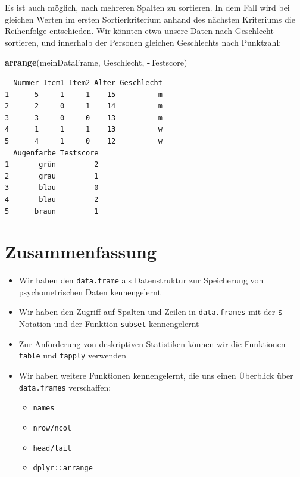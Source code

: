 \documentclass[12pt,]{tufte-book}
\newenvironment{Shaded}{\begin{snugshade}}{\end{snugshade}}
\newcommand{\KeywordTok}[1]{\textcolor[rgb]{0.13,0.29,0.53}{\textbf{#1}}}
\newcommand{\OperatorTok}[1]{\textcolor[rgb]{0.81,0.36,0.00}{\textbf{#1}}}
\newcommand{\NormalTok}[1]{#1}
\providecommand{\tightlist}{%
  \setlength{\itemsep}{0pt}\setlength{\parskip}{0pt}}
\theoremstyle{definition}
\theoremstyle{definition}
\theoremstyle{definition}
\theoremstyle{remark}
\begin{document}
Es ist auch möglich, nach mehreren Spalten zu sortieren. In dem Fall
wird bei gleichen Werten im ersten Sortierkriterium anhand des nächsten
Kriteriums die Reihenfolge entschieden. Wir könnten etwa unsere Daten
nach Geschlecht sortieren, und innerhalb der Personen gleichen
Geschlechts nach Punktzahl:

\begin{Shaded}
\begin{Highlighting}[]
\KeywordTok{arrange}\NormalTok{(meinDataFrame, Geschlecht, }\OperatorTok{-}\NormalTok{Testscore)}
\end{Highlighting}
\end{Shaded}

\begin{verbatim}
  Nummer Item1 Item2 Alter Geschlecht
1      5     1     1    15          m
2      2     0     1    14          m
3      3     0     0    13          m
4      1     1     1    13          w
5      4     1     0    12          w
  Augenfarbe Testscore
1       grün         2
2       grau         1
3       blau         0
4       blau         2
5      braun         1
\end{verbatim}

\section{Zusammenfassung}\label{zusammenfassung-1}

\begin{itemize}
\tightlist
\item
  Wir haben den \texttt{data.frame} als Datenstruktur zur Speicherung
  von psychometrischen Daten kennengelernt
\item
  Wir haben den Zugriff auf Spalten und Zeilen in \texttt{data.frames}
  mit der \texttt{\$}-Notation und der Funktion \texttt{subset}
  kennengelernt
\item
  Zur Anforderung von deskriptiven Statistiken können wir die Funktionen
  \texttt{table} und \texttt{tapply} verwenden
\item
  Wir haben weitere Funktionen kennengelernt, die uns einen Überblick
  über \texttt{data.frames} verschaffen:

  \begin{itemize}
  \tightlist
  \item
    \texttt{names}
  \item
    \texttt{nrow/ncol}
  \item
    \texttt{head/tail}
  \item
    \texttt{dplyr::arrange}
  \end{itemize}
\end{itemize}
\end{document}
